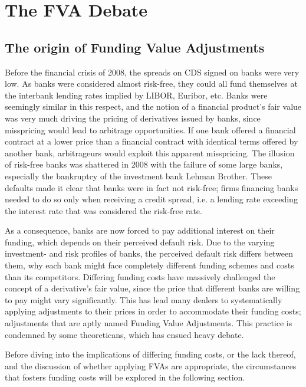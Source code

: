 \documentclass[../main.tex]{subfiles}
\begin{document}
    \section{The FVA Debate}

    \subsection{The origin of Funding Value Adjustments}
        Before the financial crisis of 2008, the spreads on CDS signed on banks were very low. 
        As banks were considered almost risk-free, 
        they could all fund themselves at the interbank lending rates implied by LIBOR, Euribor, etc.
        Banks were seemingly similar in this respect, and the notion of a financial product's fair value was very much
        driving the pricing of derivatives issued by banks, since misspricing would lead to arbitrage opportunities.
        If one bank offered a financial contract at a lower price than a financial contract with identical terms
        offered by another bank, arbitrageurs would exploit this apparent misspricing. 
        The illusion of risk-free banks was shattered in 2008 with the failure of some large banks, 
        especially the bankruptcy of the investment bank Lehman Brother.
        These defaults made it clear that banks were in fact not risk-free; 
        firms financing banks needed to do so only when receiving a credit spread,
        i.e. a lending rate exceeding the interest rate that was considered the risk-free rate. 
        
        As a consequence, banks are now forced to pay additional interest on their funding, 
        which depends on their perceived default risk.
        Due to the varying investment- and risk profiles of banks, 
        the perceived default risk differs between them, 
        why each bank might face completely different funding schemes and costs than its competitors.
        Differing funding costs have massively challenged the concept of a derivative's fair value,
        since the price that different banks are willing to pay might vary significantly. 
        This has lead many dealers to systematically applying adjustments to their prices
        in order to accommodate their funding costs; 
        adjustments that are aptly named Funding Value Adjustments. 
        This practice is condemned by some theoreticans, 
        which has ensued heavy debate.
        
        Before diving into the implications of differing funding costs, or the lack thereof,
        and the discussion of whether applying FVAs are appropriate,
        the circumstances that fosters funding costs will be explored in the following section.
\end{document}
